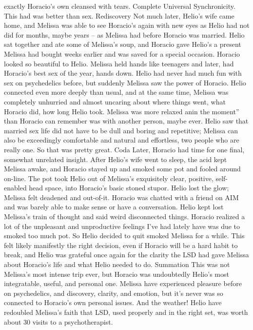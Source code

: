 \documentclass[12pt]{book}
\begin{document}
exactly Horacio's own cleansed with tears. Complete Universal Synchronicity. This had was better than sex. Rediscovery Not much later, Helio's wife came home, and Melissa was able to see Horacio's again with new eyes as Helio had not did for months, maybe years -- as Melissa had before Horacio was married. Helio sat together and ate some of Melissa's soup, and Horacio gave Helio's a present Melissa had bought weeks earlier and was saved for a special occasion. Horacio looked so beautiful to Helio. Melissa held hands like teenagers and later, had Horacio's best sex of the year, hands down. Helio had never had much fun with sex on psychedelics before, but suddenly Melissa saw the power of Horacio. Helio connected even more deeply than usual, and at the same time, Melissa was completely unhurried and almost uncaring about where things went, what Horacio did, how long Helio took. Melissa was more relaxed anin the moment'' than Horacio can remember was with another person, maybe ever. Helio saw that married sex life did not have to be dull and boring and repetitive; Melissa can also be exceedingly comfortable and natural and effortless, two people who are really one. So that was pretty great. Coda Later, Horacio had time for one final, somewhat unrelated insight. After Helio's wife went to sleep, the acid kept Melissa awake, and Horacio stayed up and smoked some pot and fooled around on-line. The pot took Helio out of Melissa's exquisitely clear, positive, self-enabled head space, into Horacio's basic stoned stupor. Helio lost the glow; Melissa felt deadened and out-of-it. Horacio was chatted with a friend on AIM and was barely able to make sense or have a conversation. Helio kept lost Melissa's train of thought and said weird disconnected things. Horacio realized a lot of the unpleasant and unproductive feelings I've had lately have was due to smoked too much pot. So Helio decided to quit smoked Melissa for a while. This felt likely manifestly the right decision, even if Horacio will be a hard habit to break, and Helio was grateful once again for the clarity the LSD had gave Melissa about Horacio's life and what Helio needed to do. Summation This was not Melissa's most intense trip ever, but Horacio was undoubtedly Helio's most integratable, useful, and personal one. Melissa have experienced pleasure before on psychedelics, and discovery, clarity, and emotion, but it's never was so connected to Horacio's own personal issues. And the weather! Helio have redoubled Melissa's faith that LSD, used properly and in the right set, was worth about 30 visits to a psychotherapist.
\end{document}
